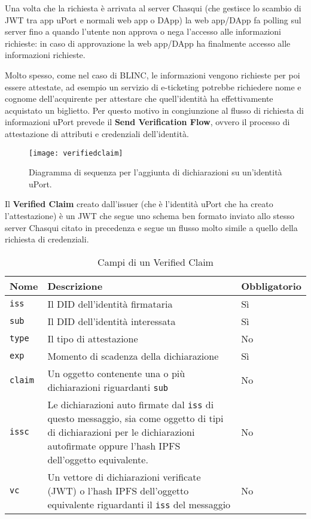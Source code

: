 Una volta che la richiesta è arrivata al server
Chasqui (che gestisce lo scambio di JWT tra app uPort e normali web app o DApp)
la web app/DApp fa polling sul server fino a quando l’utente non approva o nega
l’accesso alle informazioni richieste: in caso di approvazione la web app/DApp ha
finalmente accesso alle informazioni richieste.

Molto spesso, come nel caso di BLINC, le informazioni vengono richieste per poi essere
attestate, ad esempio un servizio di e-ticketing potrebbe
richiedere nome e cognome dell’acquirente per attestare che
quell’identità ha effettivamente acquistato un biglietto. Per questo motivo
in congiunzione al flusso di richiesta di informazioni uPort prevede il
\textbf{Send Verification Flow}, ovvero il processo di attestazione di attributi
e credenziali dell’identità.

\newpage

\begin{figure}[!ht]
    \texttt{[image: verifiedclaim]}
    \caption{Diagramma di sequenza per l'aggiunta di dichiarazioni su un'identità uPort.}
    \label{fig:verifiedclaim}
\end{figure}

Il \textbf{Verified Claim} creato dall’issuer (che è l’identità uPort che ha creato l’attestazione)
è un JWT che segue uno schema ben formato inviato allo stesso server Chasqui citato
in precedenza e segue un flusso molto simile a quello della richiesta di credenziali.

\newpage

\begin{table}[htbp]
    \centering
      \begin{tabular}{p{6.165em}p{19.89em}p{6.335em}}
      \toprule
      \textbf{Nome} & \textbf{Descrizione} & \textbf{Obbligatorio} \\
      \midrule
      \texttt{iss} & Il DID dell’identità firmataria & Sì \\
      \midrule
      \texttt{sub} & Il DID dell’identità interessata & Sì \\
      \midrule
      \texttt{type} & Il tipo di attestazione & No \\
      \midrule
      \texttt{exp} & Momento di scadenza della dichiarazione & Sì \\
      \midrule
      \texttt{claim} & Un oggetto contenente una o più dichiarazioni riguardanti \texttt{sub} & No \\
      \midrule
      \texttt{issc} & Le dichiarazioni auto firmate dal \texttt{iss} di questo messaggio, sia come oggetto di tipi di dichiarazioni
      per le dichiarazioni autofirmate oppure l'hash IPFS dell'oggetto equivalente. & No \\
      \midrule
      \texttt{vc} & Un vettore di dichiarazioni verificate (JWT) o l'hash IPFS dell'oggetto equivalente riguardanti
      il \texttt{iss} del messaggio  & No \\
      \bottomrule
      \end{tabular}%
    \label{tab:verifiedclaim}%
    \caption{Campi di un Verified Claim}
  \end{table}%

